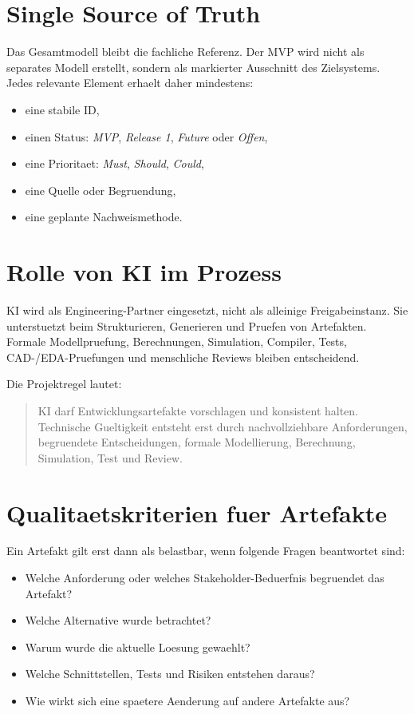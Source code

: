 \section{Single Source of Truth}

Das Gesamtmodell bleibt die fachliche Referenz. Der MVP wird nicht als separates Modell erstellt, sondern als markierter Ausschnitt des Zielsystems. Jedes relevante Element erhaelt daher mindestens:
\begin{itemize}
  \item eine stabile ID,
  \item einen Status: \emph{MVP}, \emph{Release 1}, \emph{Future} oder \emph{Offen},
  \item eine Prioritaet: \emph{Must}, \emph{Should}, \emph{Could},
  \item eine Quelle oder Begruendung,
  \item eine geplante Nachweismethode.
\end{itemize}

\section{Rolle von KI im Prozess}

KI wird als Engineering-Partner eingesetzt, nicht als alleinige Freigabeinstanz. Sie unterstuetzt beim Strukturieren, Generieren und Pruefen von Artefakten. Formale Modellpruefung, Berechnungen, Simulation, Compiler, Tests, CAD-/EDA-Pruefungen und menschliche Reviews bleiben entscheidend.

Die Projektregel lautet:
\begin{quote}
KI darf Entwicklungsartefakte vorschlagen und konsistent halten. Technische Gueltigkeit entsteht erst durch nachvollziehbare Anforderungen, begruendete Entscheidungen, formale Modellierung, Berechnung, Simulation, Test und Review.
\end{quote}

\section{Qualitaetskriterien fuer Artefakte}

Ein Artefakt gilt erst dann als belastbar, wenn folgende Fragen beantwortet sind:
\begin{itemize}
  \item Welche Anforderung oder welches Stakeholder-Beduerfnis begruendet das Artefakt?
  \item Welche Alternative wurde betrachtet?
  \item Warum wurde die aktuelle Loesung gewaehlt?
  \item Welche Schnittstellen, Tests und Risiken entstehen daraus?
  \item Wie wirkt sich eine spaetere Aenderung auf andere Artefakte aus?
\end{itemize}

